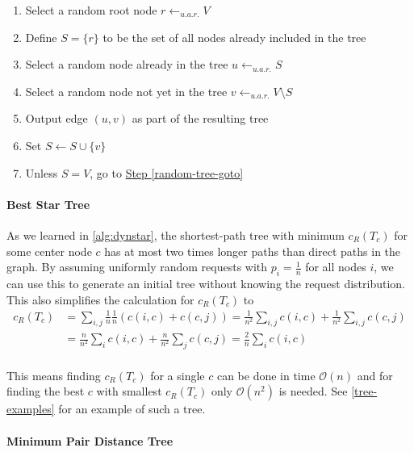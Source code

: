 \documentclass[a4paper, oneside]{discothesis}
\begin{document}
\begin{enumerate}
\item Select a random root node $r\gets_{u.a.r.}V$
\item Define $S=\{r\}$ to be the set of all nodes already included in the tree
\item Select a random node already in the tree $u\gets_{u.a.r.}S$
\label{random-tree-goto}
\item Select a random node not yet in the tree $v\gets_{u.a.r.}V\setminus S$
\item Output edge $(u,v)$ as part of the resulting tree
\item Set $S\gets S\cup\{v\}$
\item Unless $S=V$, go to \hyperref[random-tree-goto]{Step \ref{random-tree-goto}}
\end{enumerate}

\paragraph{Best Star Tree}\label{tree:star}

As we learned in \autoref{alg:dynstar}, the shortest-path tree with minimum $c_R(T_c)$ for some center node $c$ has at most two times longer paths than direct paths in the graph. By assuming uniformly random requests with $p_i=\frac{1}{n}$ for all nodes $i$, we can use this to generate an initial tree without knowing the request distribution. This also simplifies the calculation for $c_R(T_c)$ to
\begin{equation}
\begin{split}
c_R(T_c)&=\sum_{i,j}\frac{1}{n}\frac{1}{n}(c(i,c)+c(c,j))=\frac{1}{n^2}\sum_{i,j}c(i,c)+\frac{1}{n^2}\sum_{i,j}c(c,j) \\
&=\frac{n}{n^2}\sum_{i}c(i,c)+\frac{n}{n^2}\sum_{j}c(c,j)=\frac{2}{n}\sum_{i}c(i,c) \\
\end{split}
\end{equation}

This means finding $c_R(T_c)$ for a single $c$ can be done in time $\mathcal{O}(n)$ and for finding the best $c$ with smallest $c_R(T_c)$ only $\mathcal{O}(n^2)$ is needed. See \autoref{tree-examples} for an example of such a tree.

\paragraph{Minimum Pair Distance Tree}\label{tree:mpd}
\end{document}
